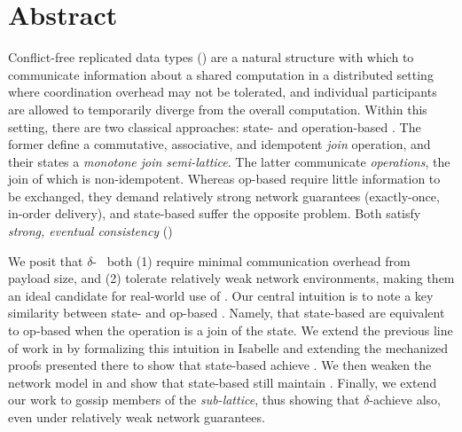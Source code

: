 \chapter*{Abstract}

Conflict-free replicated data types (\CRDTs) are a natural structure with which
to communicate information about a shared computation in a distributed setting
where coordination overhead may not be tolerated, and individual participants
are allowed to temporarily diverge from the overall computation.  Within this
setting, there are two classical approaches: state- and operation-based \CRDTs.
The former define a commutative, associative, and idempotent \textit{join}
operation, and their states a \textit{monotone join semi-lattice}. The latter
communicate \textit{operations}, the join of which is non-idempotent. Whereas
op-based \CRDTs require little information to be exchanged, they demand
relatively strong network guarantees (exactly-once, in-order delivery), and
state-based \CRDTs suffer the opposite problem. Both satisfy \textit{strong,
eventual consistency} (\SEC)

We posit that $\delta$-\CRDTs~\citep{almedia18} both (1) require minimal
communication overhead from payload size, and (2) tolerate relatively weak
network environments, making them an ideal candidate for real-world use of
\CRDTs. Our central intuition is to note a key similarity between state- and
op-based \CRDTs. Namely, that state-based \CRDTs are equivalent to op-based
\CRDTs when the operation is a join of the state. We extend the previous line of
work in \cite{gomes17} by formalizing this intuition in Isabelle and extending
the mechanized proofs presented there to show that state-based \CRDTs achieve
\SEC. We then weaken the network model in \cite{gomes17} and show that
state-based \CRDTs still maintain \SEC. Finally, we extend our work to gossip
members of the \textit{sub-lattice}, thus showing that $\delta$-\CRDTs achieve
\SEC also, even under relatively weak network guarantees.
